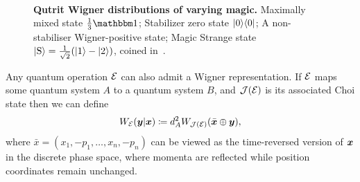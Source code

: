 \documentclass[pra,
aps,
twocolumn,
superscriptaddress,
groupedaddress,
nofootinbib,
reprint
]{revtex4-1}
\begin{document}
\begin{figure}[t]
    \centering
    \hspace{8pt}%
    \\
    \hspace{8pt}%
    \caption{\textbf{Qutrit Wigner distributions of varying magic.} 
     Maximally mixed state $\frac{1}{3}\id$;  Stabilizer zero state $|0\rangle\langle0|$;  A non-stabiliser Wigner-positive state;  Magic Strange state $\ket{{\rm{S}}} = \frac{1}{\sqrt{2}}(\ket{1} - \ket{2})$, coined in~\cite{cit:veitch2}.
    }%
    \label{fig:wstate_examples}
\end{figure}

Any quantum operation ${\mathcal E}$ can also admit a Wigner representation. If ${\mathcal E}$ maps some quantum system $A$ to a quantum system $B$, and $\mathcal{J}({\mathcal E})$ is its associated Choi state then we can define
\begin{equation}
W_{{\mathcal E}}(\boldsymbol{y} |\boldsymbol{x}) \coloneqq d_A^2 W_{\mathcal{J}({\mathcal E})}(\bar{\boldsymbol{x}} \oplus \boldsymbol{y}),
\end{equation}
where $\bar{x} =(x_1, -p_1, \dots , x_n, -p_n)$ can be viewed as the time-reversed version of $\boldsymbol{x}$ in the discrete phase space, where momenta are reflected while position coordinates remain unchanged.
\end{document}
